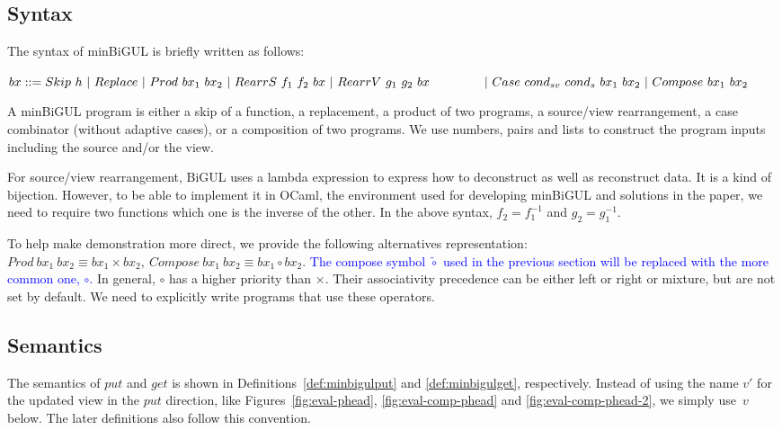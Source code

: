 \subsection{Syntax}

The syntax of minBiGUL is briefly written as follows:

\smallvspace
    $bx ::= Skip \ h \
        | \ Replace \
        | \ Prod \ bx_1 \ bx_2 \
        | \ RearrS \ f_1 \ f_2 \ bx \
        | \ RearrV \ g_1 \ g_2 \ bx \\
    \qtabs{2} | \ Case \ cond_{sv} \ cond_{s} \ bx_1 \ bx_2 \
        | \ Compose \ bx_1 \ bx_2$
\smallvspace
        
A minBiGUL program is either a skip of a function, a replacement, a product of two 
programs, a source/view rearrangement, a case combinator (without adaptive cases), or a composition of 
two programs. We use numbers, pairs and lists to construct the program inputs including the source and/or the view.

For source/view rearrangement, BiGUL uses 
a lambda expression to express how to deconstruct as well as reconstruct data. It is a kind of bijection. However, to be able to implement it in OCaml, the environment used for developing minBiGUL and solutions in the paper, we need to require two functions which one is the inverse of the other. In the above syntax, $f_2 = f_1^{-1}$ and $g_2 = g_1^{-1}$.

To help make demonstration more direct, we provide the following alternatives representation: $Prod \ bx_1 \ bx_2 \equiv bx_1 \times bx_2, \ Compose \ bx_1 \ bx_2 \equiv bx_1 \circ bx_2$. \textcolor{blue}{The compose symbol $\tilde{\circ}$ used in the previous section will be replaced with the more common one, $\circ$.}
In general, $\circ$ has a higher priority than $\times$. Their associativity precedence can be either left or right or mixture, but are not set by default. We need to explicitly write programs that use these operators.

\subsection{Semantics}

The semantics of $put$ and $get$ is shown in Definitions~\ref{def:minbigulput} and \ref{def:minbigulget}, respectively. Instead of using the name $v'$ for the updated view in the $put$ direction, like Figures~\ref{fig:eval-phead}, \ref{fig:eval-comp-phead} and \ref{fig:eval-comp-phead-2}, we 
simply 
use~$v$ below. The later definitions also follow this convention.

